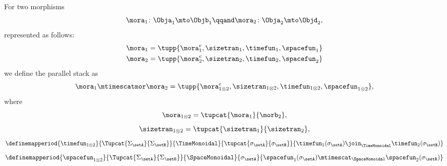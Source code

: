 \begin{lemma}
    For two morphisms 
    \begin{equation}
        \mora_1 \colon \Obja_1 \mto \Objb_1
        \qqand 
        \mora_2 \colon \Obja_2 \mto \Objd_2,
    \end{equation}
    represented as follows:
    \begin{align}
        \mora_1    &= \tupp{\mora^e_1, \sizetran_1,  \timefun_1,
        \spacefun_{1}  } \\
        \mora_2   &= \tupp{\mora^e_2, \sizetran_2,  \timefun_2, \spacefun_{2} }
    \end{align}
    we define the parallel stack as 
    \begin{equation}
        \mora_1 \mtimescatmor \mora_2 = \tupp{
            \mora^e_{1\otimes2}, 
            \sizetran_{1\otimes2}, 
             \timefun_{1\otimes2}, 
             \spacefun_{1\otimes2} 
        },
    \end{equation}
    where
    \begin{equation}
        \mora_{1\otimes2} = \tupcat {\mora_1}  {\morb_2},
    \end{equation}
    \begin{equation}
        \sizetran_{1\otimes2} =  \tupcat {\sizetran_1}  {\sizetran_2},
    \end{equation}
    \begin{equation}
        \definemapperiod{
            \timefun_{1\otimes 2}
        }{
            \Tupcat {\Sigma_{\setA}} {\Sigma_{\setB}}
        }{
            \TimeMonoidal
        }{
            \tupcat {\sigma_{\setA}} {\sigma_{\setB}}
        }{
            \timefun_1(\sigma_{\setA}) \join_{\TimeMonoidal} \timefun_2(\sigma_{\setB})
        }
    \end{equation}
    \begin{equation}
        \definemapperiod{
            \spacefun_{1\otimes2}
        }{
            \Tupcat {\Sigma_{\setA}} {\Sigma_{\setB}}
        }{
            \SpaceMonoidal
        }{
            \sigma_{\setA}
        }{
            \spacefun_1(\sigma_{\setA}) \mtimescat_{\SpaceMonoidal} \spacefun_2(\sigma_{\setB}) 
        }
    \end{equation}
\end{lemma}